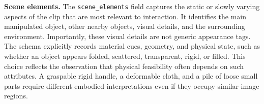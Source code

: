 \documentclass{llmxive}
\providecommand{\paragraph}[1]{\noindent\textbf{#1.}\hspace*{1em}}
\providecommand{\infobox}[1]{
    \begin{tcolorbox}[
        width=0.97\linewidth,
        center,
        colback=amappaleblue!45!white,
        colframe=amapblue!75!black,
        arc=5pt,
        boxsep=4pt,
        left=4pt,
        right=4pt,
        top=3pt,
        bottom=4pt,
        boxrule=0.8pt,
    ]
        \begin{minipage}{0.98\linewidth}
        \small\raggedright
        #1
        \end{minipage}
    \end{tcolorbox}
}
\begin{document}

\paragraph{Scene elements}
The \texttt{scene\_elements} field captures the static or slowly varying aspects of the clip that are most relevant to interaction. It identifies the main manipulated object, other nearby objects, visual details, and the surrounding environment. Importantly, these visual details are not generic appearance tags. The schema explicitly records material cues, geometry, and physical state, such as whether an object appears folded, scattered, transparent, rigid, or filled. This choice reflects the observation that physical feasibility often depends on such attributes. A graspable rigid handle, a deformable cloth, and a pile of loose small parts require different embodied interpretations even if they occupy similar image regions.
\end{document}
